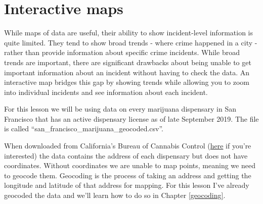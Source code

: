 \documentclass[
  12pt,
]{book}
\begin{document}
\hypertarget{interactive-maps}{%
\chapter{Interactive maps}\label{interactive-maps}}

While maps of data are useful, their ability to show incident-level information is quite limited. They tend to show broad trends - where crime happened in a city - rather than provide information about specific crime incidents. While broad trends are important, there are significant drawbacks about being unable to get important information about an incident without having to check the data. An interactive map bridges this gap by showing trends while allowing you to zoom into individual incidents and see information about each incident.

For this lesson we will be using data on every marijuana dispensary in San Francisco that has an active dispensary license as of late September 2019. The file is called ``san\_francisco\_marijuana\_geocoded.csv''.

When downloaded from California's Bureau of Cannabis Control (\href{https://aca5.accela.com/bcc/customization/bcc/cap/licenseSearch.aspx}{here} if you're interested) the data contains the address of each dispensary but does not have coordinates. Without coordinates we are unable to map points, meaning we need to
geocode them. Geocoding is the process of taking an address and getting the longitude and latitude of that address for mapping. For this lesson I've already geocoded the data and we'll learn how to do so in Chapter \ref{geocoding}.
\end{document}
